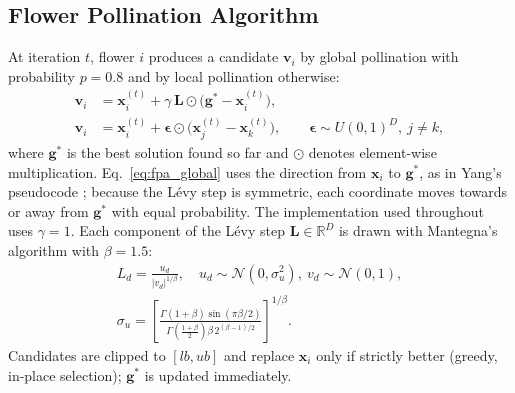 \documentclass[preprint,12pt]{elsarticle}
\newcommand{\R}{\mathbb{R}}
\begin{document}
\subsection{Flower Pollination Algorithm}
At iteration $t$, flower $i$ produces a candidate $\mathbf{v}_i$ by global pollination with probability $p=0.8$ and by local pollination otherwise:
\begin{align}
\mathbf{v}_i &= \mathbf{x}_i^{(t)}+\gamma\,\mathbf{L}\odot\bigl(\mathbf{g}^{*}-\mathbf{x}_i^{(t)}\bigr),\label{eq:fpa_global}\\
\mathbf{v}_i &= \mathbf{x}_i^{(t)}+\bm{\epsilon}\odot\bigl(\mathbf{x}_j^{(t)}-\mathbf{x}_k^{(t)}\bigr),\qquad \bm{\epsilon}\sim U(0,1)^D,\ j\neq k,\label{eq:fpa_local}
\end{align}
where $\mathbf{g}^{*}$ is the best solution found so far and $\odot$ denotes element-wise multiplication. Eq.~\eqref{eq:fpa_global} uses the direction from $\mathbf{x}_i$ to $\mathbf{g}^{*}$, as in Yang's pseudocode \citep{yang2012fpa}; because the Lévy step is symmetric, each coordinate moves towards or away from $\mathbf{g}^{*}$ with equal probability. The implementation used throughout uses $\gamma=1$. Each component of the Lévy step $\mathbf{L}\in\R^D$ is drawn with Mantegna's algorithm \citep{mantegna1994} with $\beta=1.5$:
\begin{equation}
\begin{gathered}
L_d=\frac{u_d}{|v_d|^{1/\beta}},\quad u_d\sim\mathcal{N}(0,\sigma_u^2),\ v_d\sim\mathcal{N}(0,1),\\[2pt]
\sigma_u=\left[\frac{\Gamma(1+\beta)\sin(\pi\beta/2)}{\Gamma\!\left(\frac{1+\beta}{2}\right)\beta\,2^{(\beta-1)/2}}\right]^{1/\beta}.
\end{gathered}
\label{eq:mantegna}
\end{equation}
Candidates are clipped to $[lb,ub]$ and replace $\mathbf{x}_i$ only if strictly better (greedy, in-place selection); $\mathbf{g}^{*}$ is updated immediately.
\end{document}
